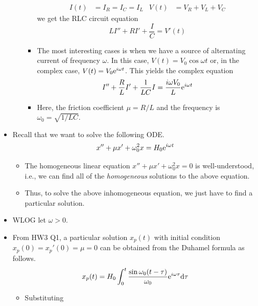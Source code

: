 \documentclass[../notes.tex]{subfiles}
\begin{document}
\begin{itemize}
\begin{enumerate}
\begin{itemize}
            \begin{align*}
                I(t) &= I_R = I_C = I_L&
                V(t) &= V_R+V_L+V_C
            \end{align*}
            we get the RLC circuit equation
            \begin{equation*}
                LI''+RI'+\frac{I}{C} = V'(t)
            \end{equation*}
            \item The most interesting cases is when we have a source of alternating current of frequency $\omega$. In this case, $V(t)=V_0\cos\omega t$ or, in the complex case, $V(t)=V_0\e[i\omega t]$. This yields the complex equation
            \begin{equation*}
                I''+\frac{R}{L}I'+\frac{1}{LC}I = \frac{i\omega V_0}{L}\e[i\omega t]
            \end{equation*}
            \item Here, the friction coefficient $\mu=R/L$ and the frequency is $\omega_0=\sqrt{1/LC}$.
        \end{itemize}
    \end{enumerate}
    \item Recall that we want to solve the following ODE.
    \begin{equation*}
        x''+\mu x'+\omega_0^2x = H_0\e[i\omega t]
    \end{equation*}
    \begin{itemize}
        \item The homogeneous linear equation $x''+\mu x'+\omega_0^2x=0$ is well-understood, i.e., we can find all of the \emph{homogeneous} solutions to the above equation.
        \item Thus, to solve the above inhomogeneous equation, we just have to find a particular solution.
    \end{itemize}
    \item WLOG let $\omega>0$.
    \item From HW3 Q1, a particular solution $x_p(t)$ with initial condition $x_p(0)=x_p'(0)=\mu=0$ can be obtained from the Duhamel formula as follows.
    \begin{equation*}
        x_p(t) = H_0\int_0^t\frac{\sin\omega_0(t-\tau)}{\omega_0}\e[i\omega\tau]\dd\tau
    \end{equation*}
    \begin{itemize}
        \item Substituting
        \begin{equation*}

\end{equation*}
\end{itemize}
\end{itemize}
\end{document}
